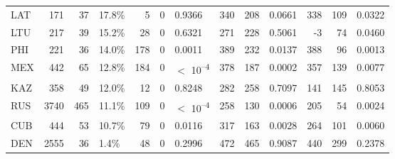 \begin{tabular}[t]{lrrlrrlrrlrrl}
LAT & 171 & 37 & 17.8\% & 5 & 0 & 0.9366 & 340 & 208 & 0.0661 & 338 & 109 & 0.0322\\
LTU & 217 & 39 & 15.2\% & 28 & 0 & 0.6321 & 271 & 228 & 0.5061 & -3 & 74 & 0.0460\\
PHI & 221 & 36 & 14.0\% & 178 & 0 & 0.0011 & 389 & 232 & 0.0137 & 388 & 96 & 0.0013\\
MEX & 442 & 65 & 12.8\% & 184 & 0 & $<$ 10\textsuperscript{--4} & 378 & 187 & 0.0002 & 357 & 139 & 0.0077\\
KAZ & 358 & 49 & 12.0\% & 12 & 0 & 0.8248 & 282 & 258 & 0.7097 & 141 & 145 & 0.8053\\
RUS & 3740 & 465 & 11.1\% & 109 & 0 & $<$ 10\textsuperscript{--4} & 258 & 130 & 0.0006 & 205 & 54 & 0.0024\\
CUB & 444 & 53 & 10.7\% & 79 & 0 & 0.0116 & 317 & 163 & 0.0028 & 264 & 101 & 0.0060\\
DEN & 2555 & 36 & 1.4\% & 48 & 0 & 0.2996 & 472 & 465 & 0.9087 & 440 & 299 & 0.2378\\
\bottomrule
\end{tabular}
